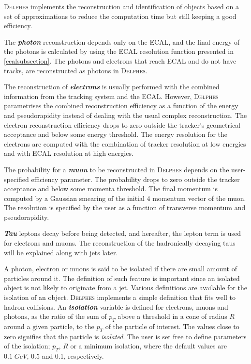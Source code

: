 {\textsc{Delphes} implements the reconstruction and identification of objects based on a set of approximations to reduce the computation time but still keeping a good efficiency.

The \emph{\textbf{photon}} reconstruction depends only on the ECAL, and the final energy of the photons is calculated by using the ECAL resolution function presented in \autoref{ecalsubsection}. The photons and electrons that reach ECAL and do not have tracks, are reconstructed as photons in \textsc{Delphes}.

The reconstruction of \emph{\textbf{electrons}} is usually performed with the combined information from the tracking system and the ECAL. However, \textsc{Delphes} parametrises the combined reconstruction efficiency as a function of the energy and pseudorapidity instead of dealing with the usual complex reconstruction. The electron reconstruction efficiency drops to zero outside the tracker's geometrical acceptance and below some energy threshold. The energy resolution for the electrons are computed with the combination of tracker resolution at low energies and with ECAL resolution at high energies.

The probability for a \emph{\textbf{muon}} to be reconstructed in \textsc{Delphes} depends on the user-specified efficiency parameter. The probability drops to zero outside the tracker acceptance and below some momenta threshold. The final momentum is computed by a Gaussian smearing of the initial 4 momentum vector of the muon. The resolution is specified by the user as a function of transverse momentum and pseudorapidity.

\emph{\textbf{Tau}} leptons decay before being detected, and hereafter, the lepton term is used for electrons and muons. The reconstruction of the hadronically decaying taus will be explained along with jets later.

A photon, electron or muons is said to be isolated if there are small amount of particles around it. The definition of such feature is important since an isolated object is not likely to originate from a jet. Various definitions are available for the isolation of an object. \textsc{Delphes} implements a simple definition that fits well to hadron collisions. An \emph{\textbf{isolation}} variable is defined for electrons, muons and photons, as the ratio of the sum of $p_T$ above a threshold in a cone of radius $R$ around a given particle, to the $p_T$ of the particle of interest. The values close to zero signifies that the particle is \emph{isolated}. The user is set free to define parameters of the isolation; $p_T$, $R$ or a minimum isolation, where the default values are $0.1 \; GeV$, 0.5 and 0.1, respectively.

}
